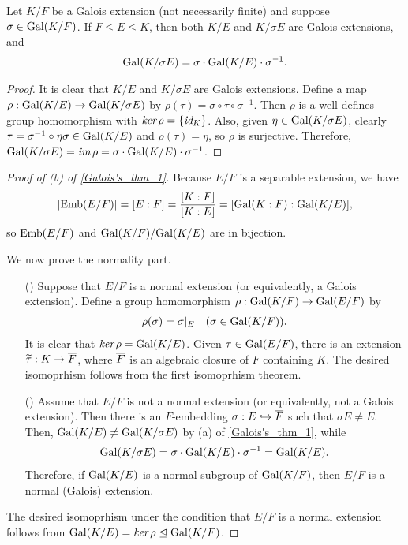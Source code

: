 \begin{prop}
    Let $K/F$ be a Galois extension (not necessarily finite) and suppose $\sigma\in{\textrm{Gal}({K/F})}$.
    If $F\leq E\leq K$, then both $K/E$ and $K/\sigma E$ are Galois extensions, and
    \begin{align*}
        {\textrm{Gal}({K/\sigma E})}=\sigma\cdot{\textrm{Gal}({K/E})}\cdot\sigma^{-1}.
    \end{align*}
\end{prop}
\begin{proof}
    It is clear that $K/E$ and $K/\sigma E$ are Galois extensions.
    Define a map $\rho: {\textrm{Gal}({K/E})}\rightarrow{\textrm{Gal}({K/\sigma E})}$ by $\rho(\tau)=\sigma\circ\tau\circ\sigma^{-1}$.
    Then $\rho$ is a well-defines group homomorphism with $\textit{ker\,}\rho=\{\textit{id}_{K}\}$.
    Also, given $\eta\in{\textrm{Gal}({K/\sigma E})}$, clearly $\tau=\sigma^{-1}\circ\eta\sigma\in{\textrm{Gal}({K/E})}$ and $\rho(\tau)=\eta$, so $\rho$ is surjective.
    Therefore, ${\textrm{Gal}({K/\sigma E})}=\textit{im\,}\rho=\sigma\cdot{\textrm{Gal}({K/E})}\cdot\sigma^{-1}$.
\end{proof}
\begin{proof}[Proof of (b) of \cref{Galois's_thm_1}]
    Because $E/F$ is a separable extension, we have
    \begin{align*}
        |{\textrm{Emb}({E/F})}|=[E:F]=\frac{[K:F]}{[K:E]}=[{\textrm{Gal}({K:F})}: {\textrm{Gal}({K/E})}],
    \end{align*}
    so ${\textrm{Emb}({E/F})}$ and ${\textrm{Gal}({K/F})}/{\textrm{Gal}({K/E})}$ are in bijection.

    We now prove the normality part.
    \begin{enumerate}
        \item[(\romannumeral 1)]
        {
            Suppose that $E/F$ is a normal extension (or equivalently, a Galois extension).
            Define a group homomorphism $\rho: {\textrm{Gal}({K/F})}\rightarrow{\textrm{Gal}({E/F})}$ by
            \begin{align*}
                \rho(\sigma)=\sigma|_E\quad(\sigma\in{\textrm{Gal}({K/F})}).
            \end{align*}
            It is clear that $\textit{ker\,}\rho={\textrm{Gal}({K/E})}$.
            Given $\tau\in{\textrm{Gal}({E/F})}$, there is an extension $\widetilde\tau: K\rightarrow\overline{F}$, where $\overline{F}$ is an algebraic closure of $F$ containing $K$.
            The desired isomoprhism follows from the first isomoprhism theorem.
        }
        \item[(\romannumeral 2)]
        {
            Assume that $E/F$ is not a normal extension (or equivalently, not a Galois extension).
            Then there is an $F$-embedding $\sigma: E\hookrightarrow\overline{F}$ such that $\sigma E\neq E$.
            Then, ${\textrm{Gal}({K/E})}\neq{\textrm{Gal}({K/\sigma E})}$ by (a) of \cref{Galois's_thm_1}, while
            \begin{align*}
                {\textrm{Gal}({K/\sigma E})}=\sigma\cdot{\textrm{Gal}({K/E})}\cdot\sigma^{-1}={\textrm{Gal}({K/E})}.
            \end{align*}
            Therefore, if ${\textrm{Gal}({K/E})}$ is a normal subgroup of ${\textrm{Gal}({K/F})}$, then $E/F$ is a normal (Galois) extension.
        }
    \end{enumerate}
    The desired isomoprhism under the condition that $E/F$ is a normal extension follows from ${\textrm{Gal}({K/E})}=\textit{ker\,}\rho\trianglelefteq{\textrm{Gal}({K/F})}$.
\end{proof}

